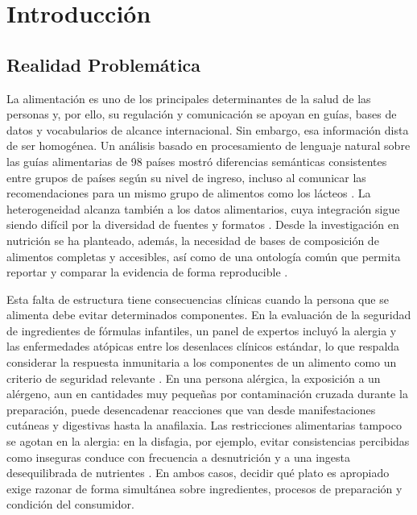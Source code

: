 \documentclass[conference]{IEEEtran}
\begin{document}
\section{Introducción}

\subsection{Realidad Problemática}

La alimentación es uno de los principales determinantes de la salud de las personas y, por ello, su regulación y comunicación se apoyan en guías, bases de datos y vocabularios de alcance internacional. Sin embargo, esa información dista de ser homogénea. Un análisis basado en procesamiento de lenguaje natural sobre las guías alimentarias de 98 países mostró diferencias semánticas consistentes entre grupos de países según su nivel de ingreso, incluso al comunicar las recomendaciones para un mismo grupo de alimentos como los lácteos \cite{bertini2026}. La heterogeneidad alcanza también a los datos alimentarios, cuya integración sigue siendo difícil por la diversidad de fuentes y formatos \cite{bindt2026}. Desde la investigación en nutrición se ha planteado, además, la necesidad de bases de composición de alimentos completas y accesibles, así como de una ontología común que permita reportar y comparar la evidencia de forma reproducible \cite{maruvada2020}.

Esta falta de estructura tiene consecuencias clínicas cuando la persona que se alimenta debe evitar determinados componentes. En la evaluación de la seguridad de ingredientes de fórmulas infantiles, un panel de expertos incluyó la alergia y las enfermedades atópicas entre los desenlaces clínicos estándar, lo que respalda considerar la respuesta inmunitaria a los componentes de un alimento como un criterio de seguridad relevante \cite{callahan2022}. En una persona alérgica, la exposición a un alérgeno, aun en cantidades muy pequeñas por contaminación cruzada durante la preparación, puede desencadenar reacciones que van desde manifestaciones cutáneas y digestivas hasta la anafilaxia. Las restricciones alimentarias tampoco se agotan en la alergia: en la disfagia, por ejemplo, evitar consistencias percibidas como inseguras conduce con frecuencia a desnutrición y a una ingesta desequilibrada de nutrientes \cite{spoladore2024}. En ambos casos, decidir qué plato es apropiado exige razonar de forma simultánea sobre ingredientes, procesos de preparación y condición del consumidor.
\end{document}
